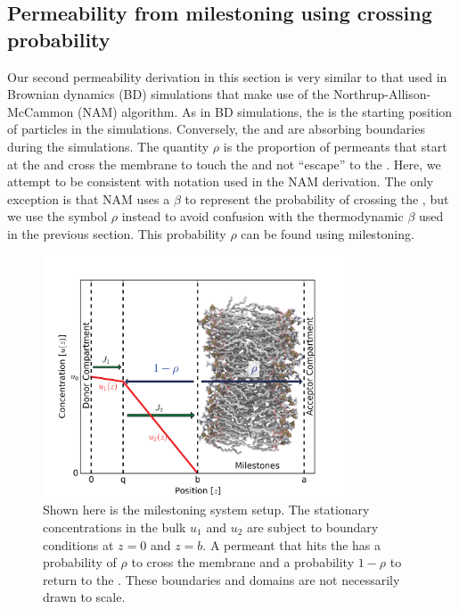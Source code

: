     \subsection{Permeability from milestoning using crossing probability}
        \par Our second permeability derivation in this section is very similar to that used in Brownian dynamics (BD) simulations that make use of the Northrup-Allison-McCammon (NAM) algorithm\cite{Northrup1984}. As in BD simulations, the  is the starting position of particles in the simulations. Conversely, the  and  are absorbing boundaries during the simulations. The quantity $\rho$ is the proportion of permeants that start at the  and cross the membrane to touch the  and not ``escape'' to the . Here, we attempt to be consistent with notation used in the NAM derivation. The only exception is that NAM uses a $\beta$ to represent the probability of crossing the , but we use the symbol $\rho$ instead to avoid confusion with the thermodynamic $\beta$ used in the previous section. This probability $\rho$ can be found using milestoning.

        \begin{figure}[!htbp]
        \begin{center}
            \includegraphics[width=0.8\textwidth]{Figures/probplot}
            \caption[Boundary conditions for computing permeability using milestoning]{Shown here is the milestoning system setup. The stationary concentrations in the bulk $u_1$ and $u_2$ are subject to boundary conditions at $z=0$ and $z=b$. A permeant that hits the  has a probability of $\rho$ to cross the membrane and a probability $1-\rho$ to return to the . These boundaries and domains are not necessarily drawn to scale.}
            \label{fig:prob}
        \end{center}
        \end{figure}

